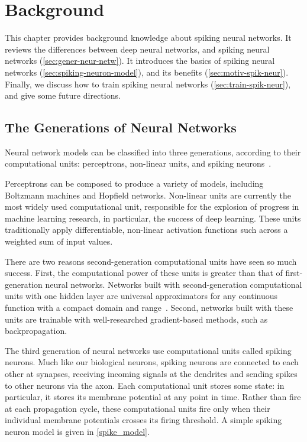 \documentclass[fyp]{socreport}
\begin{document}
\chapter{Background\label{chp:background}}

This chapter provides background knowledge about spiking neural networks. It
reviews the differences between deep neural networks, and spiking neural
networks (\ref{sec:gener-neur-netw}). It introduces the basics of spiking neural
networks (\ref{sec:spiking-neuron-model}), and its benefits
(\ref{sec:motiv-spik-neur}). Finally, we discuss how to train spiking neural
networks (\ref{sec:train-spik-neur}), and give some future directions.

\section{The Generations of Neural Networks\label{sec:gener-neur-netw}}

Neural network models can be classified into three generations, according to
their computational units: perceptrons, non-linear units, and spiking
neurons~\cite{MAASS19971659}.

Perceptrons can be composed to produce a variety of models, including Boltzmann
machines and Hopfield networks. Non-linear units are currently the most widely
used computational unit, responsible for the explosion of progress in machine
learning research, in particular, the success of deep learning. These units
traditionally apply differentiable, non-linear activation functions such across
a weighted sum of input values.

There are two reasons second-generation computational units have seen so much
success. First, the computational power of these units is greater than that of
first-generation neural networks. Networks built with second-generation
computational units with one hidden layer are universal approximators for any
continuous function with a compact domain and range~\cite{Cybenko1989}. Second,
networks built with these units are trainable with well-researched
gradient-based methods, such as backpropagation.

The third generation of neural networks use computational units called spiking
neurons. Much like our biological neurons, spiking neurons are connected to each
other at synapses, receiving incoming signals at the dendrites and sending
spikes to other neurons via the axon. Each computational unit stores some state:
in particular, it stores its membrane potential at any point in time. Rather
than fire at each propagation cycle, these computational units fire only when
their individual membrane potentials crosses its firing threshold. A simple
spiking neuron model is given in \autoref{spike_model}.
\end{document}
